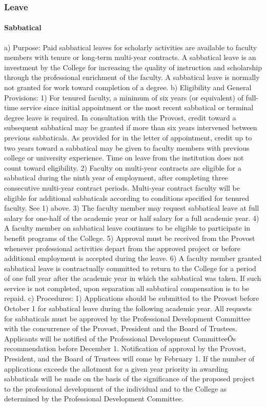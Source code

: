 \documentclass[letterpaper, 11pt]{article}
\begin{document}
		\subsubsection{Leave}
			\paragraph{Sabbatical}
				a) Purpose: Paid sabbatical leaves for scholarly activities are available to faculty members with tenure or long-term multi-year contracts.  A sabbatical leave is an investment by the College for increasing the quality of instruction and scholarship through the professional enrichment of the faculty.  A sabbatical leave is normally not granted for work toward completion of a degree.
				b) Eligibility and General Provisions:
				1) For tenured faculty, a minimum of six years (or equivalent) of full-time service since initial appointment or the most recent sabbatical or terminal degree leave is required.  In consultation with the Provost, credit toward a subsequent sabbatical may be granted if more than six years intervened between previous sabbaticals.  As provided for in the letter of appointment, credit up to two years toward a sabbatical may be given to faculty members with previous college or university experience.  Time on leave from the institution does not count toward eligibility.
				2) Faculty on multi-year contracts are eligible for a sabbatical during the ninth year of employment, after completing three consecutive multi-year contract periods.  Multi-year contract faculty will be eligible for additional sabbaticals according to conditions specified for tenured faculty.  See 1) above.
				3) The faculty member may request sabbatical leave at full salary for one-half of the academic year or half salary for a full academic year.
				4) A faculty member on sabbatical leave continues to be eligible to participate in benefit programs of the College.
				5) Approval must be received from the Provost whenever professional activities depart from the approved project or before additional employment is accepted during the leave.
				6) A faculty member granted sabbatical leave is contractually committed to return to the College for a period of one full year after the academic year in which the sabbatical was taken.  If such service is not completed, upon separation all sabbatical compensation is to be repaid.
				c) Procedures:
				1) Applications should be submitted to the Provost before October 1 for sabbatical leave during the following academic year.  All requests for sabbaticals must be approved by the Professional Development Committee with the concurrence of the Provost, President and the Board of Trustees.  Applicants will be notified of the Professional Development CommitteeÕs recommendation before December 1.  Notification of approval by the Provost, President, and the Board of Trustees will come by February 1. If the number of applications exceeds the allotment for a given year priority in awarding sabbaticals will be made on the basis of the significance of the proposed project to the professional development of the individual and to the College as determined by the Professional Development Committee.
\end{document}
